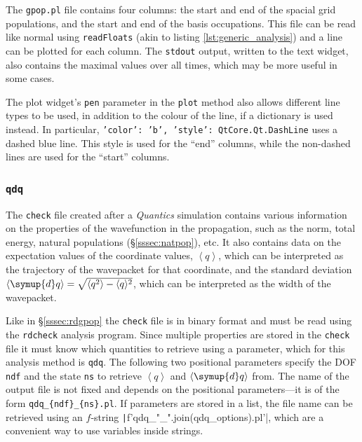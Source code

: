 \documentclass[12pt]{article}
\newcommand{\angled}[1]{\left\langle #1 \right\rangle}
\begin{document}
The \texttt{gpop.pl} file contains four columns: the start and end of the spacial grid populations, and the start and end of the basis occupations. This file can be read like normal using \texttt{readFloats} (akin to listing \ref{lst:generic_analysis}) and a line can be plotted for each column. The \texttt{stdout} output, written to the text widget, also contains the maximal values over all times, which may be more useful in some cases.

The plot widget's \texttt{pen} parameter in the \texttt{plot} method also allows different line types to be used, in addition to the colour of the line, if a dictionary is used instead. In particular, \texttt{{'color': 'b', 'style': QtCore.Qt.DashLine}} uses a dashed blue line. This style is used for the ``end'' columns, while the non-dashed lines are used for the ``start'' columns.

\subsubsection{\texttt{qdq}}\label{sssec:qdq}

The \texttt{check} file created after a \textit{Quantics} simulation contains various information on the properties of the wavefunction in the propagation, such as the norm, total energy, natural populations (\S\ref{sssec:natpop}), etc. It also contains data on the expectation values of the coordinate values, \(\angled{q}\), which can be interpreted as the trajectory of the wavepacket for that coordinate, and the standard deviation \(\angled{\symup{d}q} = \sqrt{\langle q^2\rangle - \langle q\rangle^2}\), which can be interpreted as the width of the wavepacket.

Like in \S\ref{sssec:rdgpop} the \texttt{check} file is in binary format and must be read using the \texttt{rdcheck} analysis program. Since multiple properties are stored in the \texttt{check} file it must know which quantities to retrieve using a parameter, which for this analysis method is \texttt{qdq}. The following two positional parameters specify the DOF \texttt{ndf} and the state \texttt{ns} to retrieve \(\angled{q}\) and \(\angled{\symup{d}q}\) from. The name of the output file is not fixed and depends on the positional parameters---it is of the form \texttt{qdq\_\{ndf\}\_\{ns\}.pl}. If parameters are stored in a list, the file name can be retrieved using an \(f\)-string \texttt|f'qdq_{"_".join(qdq_options)}.pl'|, which are a convenient way to use variables inside strings.
\end{document}
